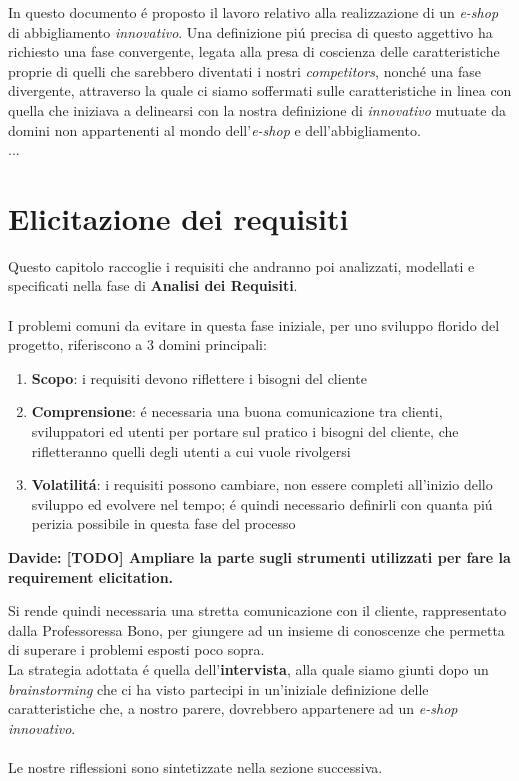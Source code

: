 \documentclass[12pt]{article}
\newcommand{\davide}[1]{{\bf \color{chromeyellow} Davide: #1 }}
\begin{document}
\newpage

\tableofcontents


\newpage

\abstract{}
In questo documento \'e proposto il lavoro relativo alla realizzazione di un \textit{e-shop} di abbigliamento \textit{innovativo}. Una definizione pi\'u precisa di questo aggettivo ha richiesto una fase convergente, legata alla presa di coscienza delle caratteristiche proprie di quelli che sarebbero diventati i nostri \textit{competitors}, nonch\'e una fase divergente, attraverso la quale ci siamo soffermati sulle caratteristiche in linea con quella che iniziava a delinearsi con la nostra definizione di \textit{innovativo} mutuate da domini non appartenenti al mondo dell'\textit{e-shop} e dell'abbigliamento. 
\\
...

\newpage

\section{Elicitazione dei requisiti}
Questo capitolo raccoglie i requisiti che andranno poi analizzati, modellati e specificati nella fase di \textbf{Analisi dei Requisiti}. 
\\
\\
I problemi comuni da evitare in questa fase iniziale, per uno sviluppo florido del progetto, riferiscono a 3 domini principali:
\begin{enumerate}
	\item \textbf{Scopo}: i requisiti devono riflettere i bisogni del cliente
	\item \textbf{Comprensione}: \'e necessaria una buona comunicazione tra clienti, sviluppatori ed utenti per portare sul pratico i bisogni del cliente, che rifletteranno quelli degli utenti a cui vuole rivolgersi
	\item \textbf{Volatilit\'a}: i requisiti possono cambiare, non essere completi all'inizio dello sviluppo ed evolvere nel tempo; \'e quindi necessario definirli con quanta pi\'u perizia possibile in questa fase del processo
\end{enumerate}

\davide{\textbf{[TODO]} Ampliare la parte sugli strumenti utilizzati per fare la requirement elicitation.}

Si rende quindi necessaria una stretta comunicazione con il cliente, rappresentato dalla Professoressa Bono, per giungere ad un insieme di conoscenze che permetta di superare i problemi esposti poco sopra. \\
La strategia adottata \'e quella dell'\textbf{intervista}, alla quale siamo giunti dopo un \textit{brainstorming} che ci ha visto partecipi in un'iniziale definizione delle caratteristiche che, a nostro parere, dovrebbero appartenere ad un \textit{e-shop innovativo}.
\\
\\
Le nostre riflessioni sono sintetizzate nella sezione successiva. 
\end{document}
